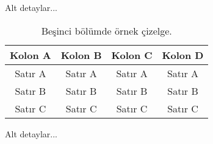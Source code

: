 Alt detaylar... 

\begin{table*}
{\setlength{\tabcolsep}{14pt}
\caption{Be\c{s}inci b\"ol\"umde \"ornek \c{c}izelge.}
\begin{center}
\vspace{-6mm}
\begin{tabular}{cccc}
\hline\hline
Kolon A & Kolon B & Kolon C & Kolon D \\
\hline
Sat\i r A & Sat\i r A & Sat\i r A & Sat\i r A \\
Sat\i r B & Sat\i r B & Sat\i r B & Sat\i r B \\
Sat\i r C & Sat\i r C & Sat\i r C & Sat\i r C \\
\hline
\end{tabular}
\vspace{-6mm}
\end{center}
\label{tableforCh5-1}}
\end{table*}

Alt detaylar... 